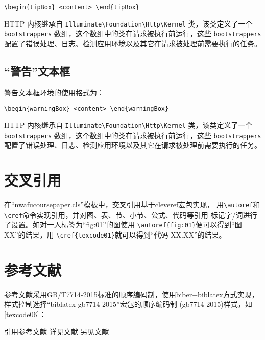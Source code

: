 \documentclass{nwafucoursepaper}
\begin{document}
\verb|\begin{tipBox} <content> \end{tipBox}|

\begin{tipBox}
  HTTP 内核继承自 \verb|Illuminate\Foundation\Http\Kernel| 类，该类定义了一个 \verb|bootstrappers| 数组，这个数组中的类在请求被执行前运行，这些 \verb|bootstrappers| 配置了错误处理、日志、检测应用环境以及其它在请求被处理前需要执行的任务。
\end{tipBox}
\subsection{\enquote{警告}文本框}
警告文本框环境的使用格式为：

\verb|\begin{warningBox} <content> \end{warningBox}|

\begin{warningBox}
  HTTP 内核继承自 \verb|Illuminate\Foundation\Http\Kernel| 类，该类定义了一个 \verb|bootstrappers| 数组，这个数组中的类在请求被执行前运行，这些 \verb|bootstrappers| 配置了错误处理、日志、检测应用环境以及其它在请求被处理前需要执行的任务。
\end{warningBox}

\section{交叉引用}
在\enquote{nwafucoursepaper.cls}模板中，交叉引用基于cleveref宏包实现，
用\verb|\autoref|和\verb|\cref|命令实现引用，并对图、表、节、小节、公式、代码等引用
标记字/词进行了设置。如对一人标签为\enquote{fig:01}的图使用
\verb|\autoref{fig:01}|便可以得到\enquote{图 XX}的结果，用
\verb|\cref{texcode01}|就可以得到\enquote{代码 XX.XX}的结果。

\section{参考文献}
参考文献采用GB/T7714-2015标准的顺序编码制，使用biber+biblatex方式实现，
样式控制选择\enquote{biblatex-gb7714-2015}宏包的顺序编码制
(gb7714-2015)样式，如\cref{texcode06}：

\begin{center}
  \begin{langCVOne}[tex][texcode06][\LaTeX{}]{引用参考文献}
    详见文献\cite{Peebles2001-100-100}\parencite{Babu2014--}
    另见文献\cite[49]{于潇2012-1518-1523}\parencite[106]{Babu2014--}
  \end{langCVOne}
\end{center}
\end{document}
